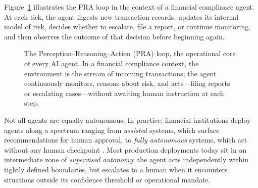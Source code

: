\documentclass{article}
\begin{document}
Figure~\ref{fig:pra-loop} illustrates the PRA loop in the context of a financial compliance agent. At each tick, the agent ingests new transaction records, updates its internal model of risk, decides whether to escalate, file a report, or continue monitoring, and then observes the outcome of that decision before beginning again.

\begin{figure}[ht]
\centering
{}
\caption{The Perception–Reasoning–Action (PRA) loop, the operational core of every AI agent. In a financial compliance context, the environment is the stream of incoming transactions; the agent continuously monitors, reasons about risk, and acts---filing reports or escalating cases---without awaiting human instruction at each step.}
\label{fig:pra-loop}
\end{figure}

Not all agents are equally autonomous. In practice, financial institutions deploy agents along a spectrum ranging from \textit{assisted} systems, which surface recommendations for human approval, to \textit{fully autonomous} systems, which act without any human checkpoint \cite{shavit2023practices}. Most production deployments today sit in an intermediate zone of \textit{supervised autonomy}: the agent acts independently within tightly defined boundaries, but escalates to a human when it encounters situations outside its confidence threshold or operational mandate.
\end{document}
